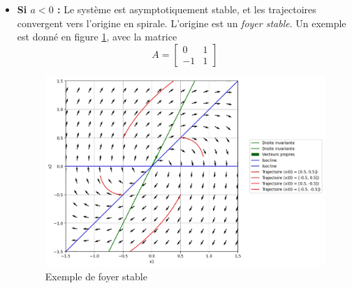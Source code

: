 \begin{itemize}
                \item \textbf{Si $a < 0$ :} Le système est asymptotiquement stable, et les trajectoires convergent vers l'origine en spirale. L'origine est un \textit{foyer stable}. Un exemple est donné en figure \ref{fig:foyer_stable}, avec la matrice
                \begin{equation}
                    A = \begin{bmatrix} 0 & 1 \\ -1 & 1 \end{bmatrix}
                \end{equation}
                \begin{figure}[ht!]
                    \centering
                    \includegraphics[width=\textwidth]{images/foyer_stable.jpg}
                    \caption{Exemple de foyer stable}
                    \label{fig:foyer_stable}
                \end{figure}
                

\end{itemize}
